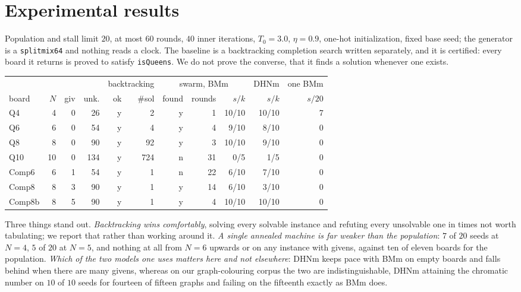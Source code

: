 \documentclass{easychair}
\begin{document}
\section{Experimental results}\label{sec:meas}

Population and stall limit $20$, at most $60$ rounds, $40$ inner iterations, $T_0 = 3.0$,
$\eta = 0.9$, one-hot initialization, fixed base seed; the generator is a \texttt{splitmix64} and
nothing reads a clock. The baseline is a backtracking completion search written separately, and it is
certified: every board it returns is proved to satisfy \lstinline{isQueens}. We do not prove the
converse, that it finds a solution whenever one exists.

\begin{center}\small
\begin{tabular}{@{}lrrr rr rrr r r@{}}
\toprule
& & & & \multicolumn{2}{c}{backtracking} & \multicolumn{3}{c}{swarm, BMm} & DHNm & one BMm\\
\cmidrule(lr){5-6}\cmidrule(lr){7-9}\cmidrule(lr){10-10}\cmidrule(lr){11-11}
board & $N$ & giv & unk. & ok & \#sol & found & rounds & $s/k$ & $s/k$ & $s/20$\\
\midrule
Q4     & 4  & 0 & 26  & y & 2   & y & 1  & 10/10 & 10/10 & 7\\
Q6     & 6  & 0 & 54  & y & 4   & y & 4  & 9/10  & 8/10  & 0\\
Q8     & 8  & 0 & 90  & y & 92  & y & 3  & 10/10 & 9/10  & 0\\
Q10    & 10 & 0 & 134 & y & 724 & n & 31 & 0/5   & 1/5   & 0\\
Comp6  & 6  & 1 & 54  & y & 1   & n & 22 & 6/10  & 7/10  & 0\\
Comp8  & 8  & 3 & 90  & y & 1   & y & 14 & 6/10  & 3/10  & 0\\
Comp8b & 8  & 5 & 90  & y & 1   & y & 4  & 10/10 & 10/10 & 0\\
\bottomrule
\end{tabular}
\end{center}

Three things stand out. \emph{Backtracking wins comfortably}, solving every solvable instance and
refuting every unsolvable one in times not worth tabulating; we report that rather than working around
it. \emph{A single annealed machine is far weaker than the population}: $7$ of $20$ seeds at $N = 4$,
$5$ of $20$ at $N = 5$, and nothing at all from $N = 6$ upwards or on any instance with givens,
against ten of eleven boards for the population. \emph{Which of the two models one uses matters here
and not elsewhere}: DHNm keeps pace with BMm on empty boards and falls behind when there are many
givens, whereas on our graph-colouring corpus the two are indistinguishable, DHNm attaining the
chromatic number on $10$ of $10$ seeds for fourteen of fifteen graphs and failing on the fifteenth
exactly as BMm does.
\end{document}
